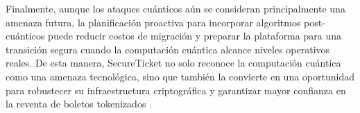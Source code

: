 Finalmente, aunque los ataques cuánticos aún se consideran principalmente una amenaza futura, la planificación proactiva para incorporar algoritmos post-cuánticos puede reducir costos de migración y preparar la plataforma para una transición segura cuando la computación cuántica alcance niveles operativos reales. De esta manera, SecureTicket no solo reconoce la computación cuántica como una amenaza tecnológica, sino que también la convierte en una oportunidad para robustecer su infraestructura criptográfica y garantizar mayor confianza en la reventa de boletos tokenizados \cite{postquantumblockchain}.